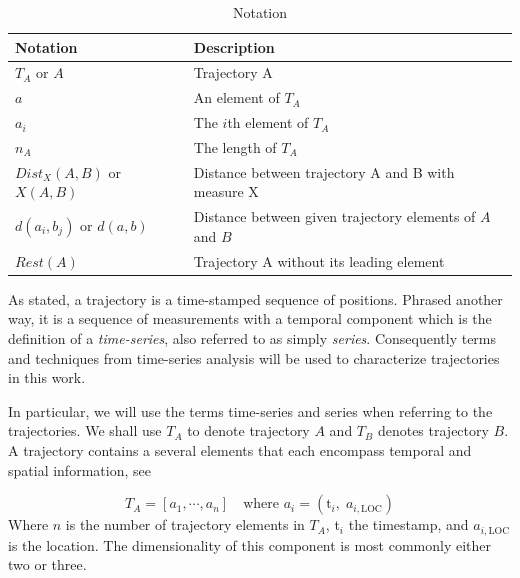 \begin{table}[b] 
\centering 
\caption{Notation}
\label{tb:notation}
\renewcommand{\arraystretch}{1.4}
\begin{tabular}{|l|l|} 
\hline
\textbf{Notation}   & \textbf{Description}                    \\
\hline
$T_A$ or $A$   &  Trajectory A         \\
\hline
$a$           &  An element of $T_A$         \\
\hline
$a_i$           &  The  $i$th element of $T_A$         \\
\hline
$n_A$         &  The length of $T_A$ \\
\hline
$Dist_{X}(A, B)$ or ${X}(A, B)$       & Distance between trajectory A and B with measure X          \\
\hline
$d(a_i, b_j)$ or $d(a, b)$           &  Distance between given trajectory elements of $A$ and $B$        \\
\hline
$Rest(A)$         &  Trajectory A without its leading element \\
\hline
\end{tabular}
\end{table}



As stated, a trajectory is a time-stamped sequence of positions. 
Phrased another way, it is a sequence of measurements with a temporal component which is the definition of a \textit{time-series}, also referred to as simply \textit{series}.
Consequently terms and techniques from time-series analysis will be used to characterize trajectories in this work.

In particular, we will use the terms time-series and series when referring to the trajectories.
We shall use $T_A$ to denote trajectory $A$ and $T_B$ denotes trajectory $B$.
A trajectory contains a several elements that each encompass temporal and spatial information, see   

\clearpage
\begin{equation}\label{eq:trajectory_ts}    
T_A =  [a_1,\cdots , a_n] \quad \text{where }  a_i = ( \text{t}_i , \; a_{i,\text{LOC}})
\end{equation}
Where $n$ is the number of trajectory elements in $T_A$,  t$_i$ the timestamp, and $a_{i,\text{LOC}}$ is the location. The dimensionality of this component is most commonly either two or three\cite{17-TrajectorySimilarity}. 


